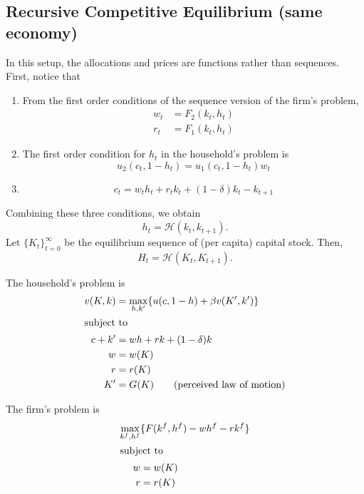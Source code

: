 \documentclass[11pt]{article}
\begin{document}
\subsection{Recursive Competitive Equilibrium (same economy)}
\label{sec:org198a350}
In this setup, the allocations and prices are functions rather than sequences. First, notice that
\begin{enumerate}
\item From the first order conditions of the sequence version of the firm's problem,
\begin{align*}
w_t &= F_2(k_t, h_t)\\
r_t &= F_1(k_t, h_t)
\end{align*}
\item The first order condition for $h_t$ in the household's problem is
\[
u_2(c_t, 1 - h_t) = u_1(c_t, 1 - h_t)w_t
\]
\item
\[
c_t = w_t h_t + r_t k_t + (1 - \delta)k_t - k_{t + 1}
\]
\end{enumerate}
Combining these three conditions, we obtain
\[
h_t = \mathcal{H}(k_t, k_{t + 1}).
\]
Let \(\{K_t\}^\infty_{t = 0}\) be the equilibrium sequence of (per capita) capital stock. Then,
\[
H_t = \mathcal{H} (K_t, K_{t + 1}).
\]

The household's problem is
\begin{align*}
v(K, k) &= \max_{h, k'} \{u(c, 1 - h) + \beta v(K', k')\}\\
\intertext{subject to}
c + k' &= wh + rk + (1 - \delta)k\\
w &= w(K)\\
r &= r(K)\\
K' &= G(K) \tag{perceived law of motion}
\end{align*}

The firm's problem is
\begin{align*}
\max_{k^f, h^f} &\{F(k^f, h^f) - wh^f - rk^f\}\\
\intertext{subject to}
w &= w(K)\\
r &= r(K)
\end{align*}
\end{document}
